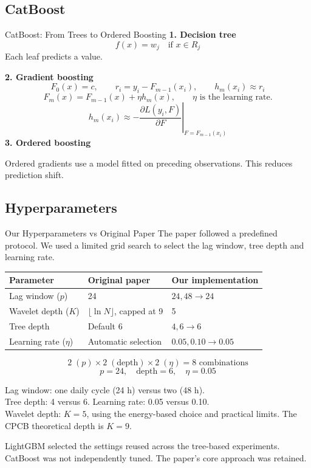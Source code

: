 \subsection{CatBoost}
\begin{frame}{CatBoost: From Trees to Ordered Boosting}
  \small
  \textbf{1. Decision tree}
  \[
    f(x)=w_j \quad \text{if }x\in R_j
  \]
  Each leaf predicts a value.\par\smallskip
  \textbf{2. Gradient boosting}
  \[
    F_0(x)=c,\qquad
    r_i=y_i-F_{m-1}(x_i),\qquad h_m(x_i)\approx r_i
  \]
  \[
    F_m(x)=F_{m-1}(x)+\eta h_m(x),
    \qquad \eta\text{ is the learning rate.}
  \]
  \[
    h_m(x_i)\approx
    -\left.\frac{\partial L(y_i,F)}{\partial F}\right|_{F=F_{m-1}(x_i)}
  \]
  \textbf{3. Ordered boosting}\par
  Ordered gradients use a model fitted on preceding observations.
  This reduces prediction shift.\par
\end{frame}

\subsection{Hyperparameters}
\begin{frame}{Our Hyperparameters vs Original Paper}
  \small
  The paper followed a predefined protocol. We used a limited grid search
  to select the lag window, tree depth and learning rate.
  \medskip
  \centering
  {\scriptsize
  \begin{tabular}{lll}
    \toprule
    Parameter & Original paper & Our implementation \\
    \midrule
    Lag window ($p$) & 24 & $24,48 \rightarrow 24$ \\
    Wavelet depth ($K$) & $\lfloor\ln N\rfloor$, capped at 9 & 5 \\
    Tree depth & Default 6 & $4,6 \rightarrow 6$ \\
    Learning rate ($\eta$) & Automatic selection & $0.05,0.10 \rightarrow 0.05$ \\
    \bottomrule
  \end{tabular}
  }
  \[
    2\;(p)\times2\;(\mathrm{depth})\times2\;(\eta)
    =\boxed{8\text{ combinations}}
  \]
  \[
    \boxed{p=24,\quad \mathrm{depth}=6,\quad \eta=0.05}
  \]
  \begin{flushleft}
  \scriptsize
  Lag window: one daily cycle (24 h) versus two (48 h).\\
  Tree depth: 4 versus 6. Learning rate: 0.05 versus 0.10.\\
  Wavelet depth: $K=5$, using the energy-based choice and practical limits.
  The CPCB theoretical depth is $K=9$.\par\smallskip
  LightGBM selected the settings reused across the tree-based experiments.
  CatBoost was not independently tuned. The paper's core approach was retained.
  \end{flushleft}
\end{frame}

